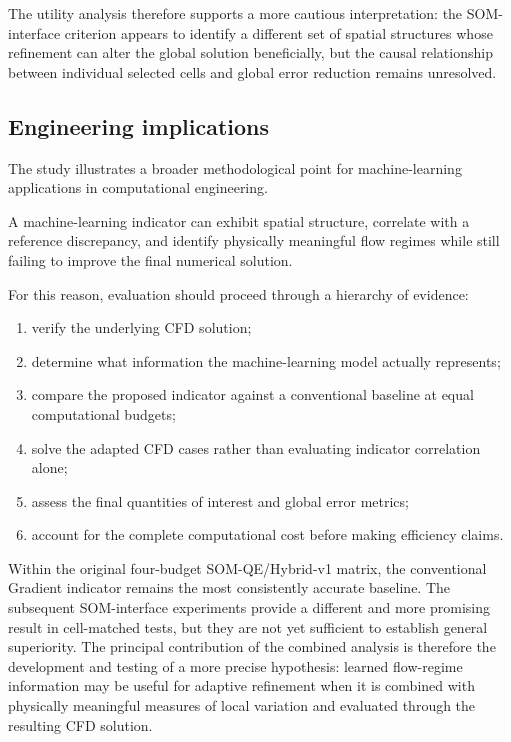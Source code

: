 The utility analysis therefore supports a more cautious interpretation:
the SOM-interface criterion appears to identify a different set of spatial
structures whose refinement can alter the global solution beneficially,
but the causal relationship between individual selected cells and global
error reduction remains unresolved.


\subsection{Engineering implications}

The study illustrates a broader methodological point for machine-learning
applications in computational engineering.

A machine-learning indicator can exhibit spatial structure, correlate with a
reference discrepancy, and identify physically meaningful flow regimes while
still failing to improve the final numerical solution.

For this reason, evaluation should proceed through a hierarchy of evidence:

\begin{enumerate}
    \item verify the underlying CFD solution;
    \item determine what information the machine-learning model actually
    represents;
    \item compare the proposed indicator against a conventional baseline at
    equal computational budgets;
    \item solve the adapted CFD cases rather than evaluating indicator
    correlation alone;
    \item assess the final quantities of interest and global error metrics;
    \item account for the complete computational cost before making
    efficiency claims.
\end{enumerate}

Within the original four-budget SOM-QE/Hybrid-v1 matrix, the conventional
Gradient indicator remains the most consistently accurate baseline. The
subsequent SOM-interface experiments provide a different and more promising
result in cell-matched tests, but they are not yet sufficient to establish
general superiority. The principal contribution of the combined analysis is
therefore the development and testing of a more precise hypothesis: learned
flow-regime information may be useful for adaptive refinement when it is
combined with physically meaningful measures of local variation and
evaluated through the resulting CFD solution.

